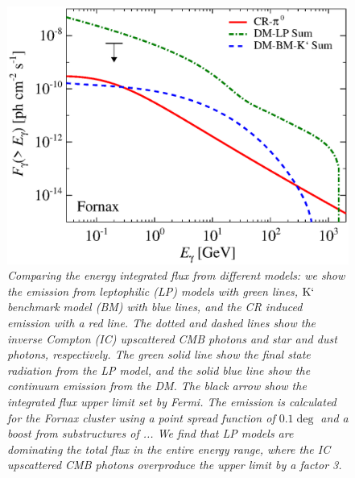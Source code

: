 \documentclass[10pt,aps,pra,reprint,amsmath,amsfonts,amssymb,showpacs]{revtex4-1}
\newcommand{\rmn}{\mathrm}
\newcommand{\Km}{\rmn{K}`}
\begin{document}
\begin{figure}
 \includegraphics[width=0.99\columnwidth]{figures/flux.int.v9.0.1deg.1.6T.SubMass.SF300.IR2.noMW.woGal.eps}
\caption{\it Comparing the energy integrated flux from different
  models: we show the emission from leptophilic (LP) models with green
  lines, $\Km$ benchmark model (BM) with blue lines, and the CR
  induced emission with a red line. The dotted and dashed lines show
  the inverse Compton (IC) upscattered CMB photons and star and dust
  photons, respectively. The green solid line show the final state
  radiation from the LP model, and the solid blue line show the
  continuum emission from the DM. The black arrow show the integrated
  flux upper limit set by Fermi.  The emission is calculated for the
  Fornax cluster using a point spread function of $0.1\deg$ and a
  boost from substructures of ...  We find that LP models are
  dominating the total flux in the entire energy range, where the IC
  upscattered CMB photons overproduce the upper limit by a factor 3.}
 \label{fig8}
\end{figure}
\end{document}

